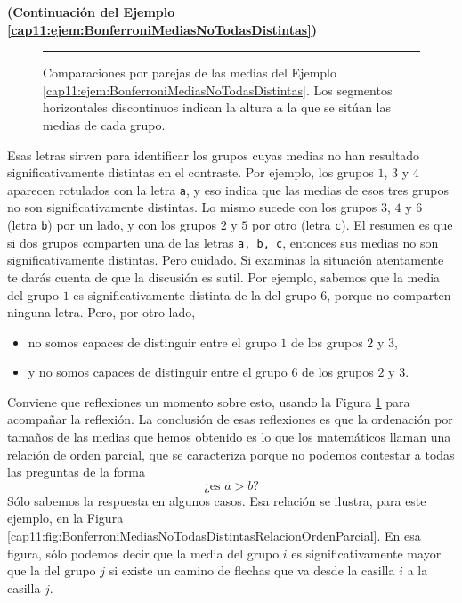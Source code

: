 \begin{ejemplo}{\bf (Continuación del Ejemplo \ref{cap11:ejem:BonferroniMediasNoTodasDistintas})}
\begin{figure}[htbp]
\begin{center}
\begin{bn}
\hrule
\end{bn}
\caption{Comparaciones por parejas de las medias del Ejemplo \ref{cap11:ejem:BonferroniMediasNoTodasDistintas}. Los segmentos horizontales discontinuos indican la altura a la que se sitúan las medias de cada grupo.}
\label{cap11:fig:BonferroniMediasNoTodasDistintasBoxplotsGrupos}
\end{center}
\end{figure}

Esas letras sirven para identificar los grupos cuyas medias no han resultado significativamente
distintas en el contraste. Por ejemplo, los grupos $1$, $3$ y $4$ aparecen rotulados con la letra
{\tt a}, y eso indica que las medias de esos tres grupos no son significativamente distintas. Lo
mismo sucede con los grupos $3$, $4$ y $6$ (letra {\tt b}) por un lado, y con los grupos $2$ y $5$
por otro (letra {\tt c}). El resumen es que si dos grupos comparten una de las letras {\tt a, b, c}, entonces sus medias no son significativamente distintas.
Pero cuidado. Si examinas la situación atentamente te darás cuenta de que la discusión es sutil.
Por ejemplo, sabemos que la media del grupo $1$ es significativamente distinta de la del grupo $6$,
porque no comparten ninguna letra. Pero, por otro lado,
\begin{itemize}
  \item no somos capaces de distinguir entre el grupo $1$ de los grupos $2$ y $3$,
  \item y no somos capaces de distinguir entre el grupo $6$ de los grupos $2$ y $3$.
\end{itemize}
Conviene que reflexiones un momento sobre esto, usando la Figura
\ref{cap11:fig:BonferroniMediasNoTodasDistintasBoxplotsGrupos} para acompañar la reflexión.
La conclusión de esas reflexiones es que la ordenación por tamaños de las medias que hemos obtenido
es lo que los matemáticos llaman una {\sf relación de orden parcial}, que se caracteriza porque no podemos contestar a todas las
preguntas de la forma
\[\mbox{¿es $a > b$?}\]
Sólo sabemos la respuesta en algunos casos. Esa relación se ilustra, para este ejemplo, en la
Figura \ref{cap11:fig:BonferroniMediasNoTodasDistintasRelacionOrdenParcial}. En esa figura, sólo
podemos decir que la media del grupo $i$ es significativamente mayor que la del grupo $j$ si existe
un camino de flechas que va desde la casilla $i$ a la casilla $j$.


\end{ejemplo}
